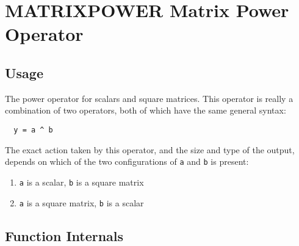 \section{MATRIXPOWER Matrix Power Operator}

\subsection{Usage}

The power operator for scalars and square matrices.  This operator is really a 
combination of two operators, both of which have the same general syntax:
\begin{verbatim}
  y = a ^ b
\end{verbatim}
The exact action taken by this operator, and the size and type of the output, 
depends on which of the two configurations of \verb|a| and \verb|b| is present:
\begin{enumerate}
  \item \verb|a| is a scalar, \verb|b| is a square matrix
  \item \verb|a| is a square matrix, \verb|b| is a scalar
\end{enumerate}
\subsection{Function Internals}

